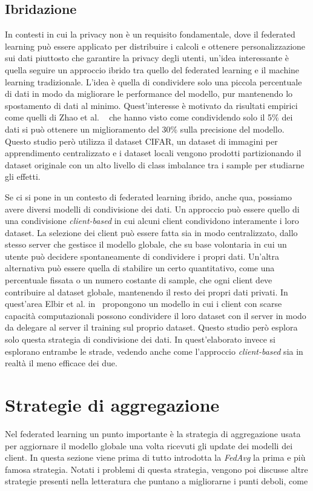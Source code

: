 \subsection{Ibridazione}
In contesti in cui la privacy non è un requisito fondamentale, dove il
federated learning può essere applicato per distribuire i calcoli e 
ottenere personalizzazione sui dati piuttosto che garantire la privacy
degli utenti, un'idea interessante è quella seguire un approccio ibrido 
tra quello del federated learning e il machine learning tradizionale.
L'idea è quella di condividere solo una piccola percentuale di dati 
in modo da migliorare le performance del modello, pur mantenendo lo 
spostamento di dati al minimo. Quest'interesse è motivato da risultati 
empirici come quelli di Zhao et al. ~\cite{zhao2018flniid} che hanno 
visto come condividendo solo il 5\% dei dati si può ottenere un 
miglioramento del 30\% sulla precisione del modello. Questo studio 
però utilizza il dataset CIFAR, un dataset di immagini per apprendimento 
centralizzato e i dataset locali vengono prodotti partizionando il 
dataset originale con un alto livello di class imbalance tra i 
sample per studiarne gli effetti. 

Se ci si pone in un contesto di federated learning ibrido, anche qua,
possiamo avere diversi modelli di condivisione dei dati. Un approccio 
può essere quello di una condivisione \textit{client-based} in cui alcuni client 
condividono interamente i loro dataset. La selezione dei client può 
essere fatta sia in modo centralizzato, dallo stesso server che gestisce 
il modello globale, che su base volontaria in cui un utente può decidere 
spontaneamente di condividere i propri dati.
Un'altra alternativa può essere quella di stabilire un certo quantitativo,
come una percentuale fissata o un numero costante di sample, che ogni 
client deve contribuire al dataset globale, mantenendo il resto dei 
propri dati privati. 
In quest'area Elbir et al. in~\cite{Elbir2020HybridFA, Elbir2021AHA} 
propongono un modello 
in cui i client con scarse capacità computazionali possono condividere il 
loro dataset con il server in modo da delegare al server il training sul 
proprio dataset. Questo studio però esplora solo questa strategia di 
condivisione dei dati. In quest'elaborato invece si esplorano 
entrambe le strade, vedendo anche come l'approccio \textit{client-based} 
sia in realtà il meno efficace dei due.


\section{Strategie di aggregazione}
Nel federated learning un punto importante è la strategia di aggregazione
usata per aggiornare il modello globale una volta ricevuti gli update 
dei modelli dei client. In questa sezione viene prima di tutto introdotta 
la \textit{FedAvg} la prima e più famosa strategia. Notati i problemi 
di questa strategia, vengono poi discusse altre strategie presenti 
nella letteratura che puntano a migliorarne i punti deboli, come 

